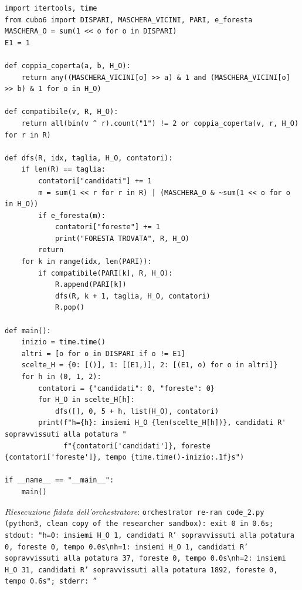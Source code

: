 \documentclass[11pt,a4paper]{article}
\begin{document}
\begin{lstlisting}[caption={attempt\_001 code\_2 [python, rigore exact] — Computation 3: refutes (★₀) (all peaks in one class) by pruned DFS over R' (every distance — approvato dal Referee}]
import itertools, time
from cubo6 import DISPARI, MASCHERA_VICINI, PARI, e_foresta
MASCHERA_O = sum(1 << o for o in DISPARI)
E1 = 1

def coppia_coperta(a, b, H_O):
    return any((MASCHERA_VICINI[o] >> a) & 1 and (MASCHERA_VICINI[o] >> b) & 1 for o in H_O)

def compatibile(v, R, H_O):
    return all(bin(v ^ r).count("1") != 2 or coppia_coperta(v, r, H_O) for r in R)

def dfs(R, idx, taglia, H_O, contatori):
    if len(R) == taglia:
        contatori["candidati"] += 1
        m = sum(1 << r for r in R) | (MASCHERA_O & ~sum(1 << o for o in H_O))
        if e_foresta(m):
            contatori["foreste"] += 1
            print("FORESTA TROVATA", R, H_O)
        return
    for k in range(idx, len(PARI)):
        if compatibile(PARI[k], R, H_O):
            R.append(PARI[k])
            dfs(R, k + 1, taglia, H_O, contatori)
            R.pop()

def main():
    inizio = time.time()
    altri = [o for o in DISPARI if o != E1]
    scelte_H = {0: [()], 1: [(E1,)], 2: [(E1, o) for o in altri]}
    for h in (0, 1, 2):
        contatori = {"candidati": 0, "foreste": 0}
        for H_O in scelte_H[h]:
            dfs([], 0, 5 + h, list(H_O), contatori)
        print(f"h={h}: insiemi H_O {len(scelte_H[h])}, candidati R' sopravvissuti alla potatura "
              f"{contatori['candidati']}, foreste {contatori['foreste']}, tempo {time.time()-inizio:.1f}s")

if __name__ == "__main__":
    main()

\end{lstlisting}
\noindent\emph{Riesecuzione fidata dell'orchestratore}: \texttt{orchestrator re-ran code\_2.py (python3, clean copy of the researcher sandbox): exit 0 in 0.6s; stdout: "h=0: insiemi H\_O 1, candidati R' sopravvissuti alla potatura 0, foreste 0, tempo 0.0s\textbackslash{}nh=1: insiemi H\_O 1, candidati R' sopravvissuti alla potatura 37, foreste 0, tempo 0.0s\textbackslash{}nh=2: insiemi H\_O 31, candidati R' sopravvissuti alla potatura 1892, foreste 0, tempo 0.6s"; stderr: ''}
\end{document}
